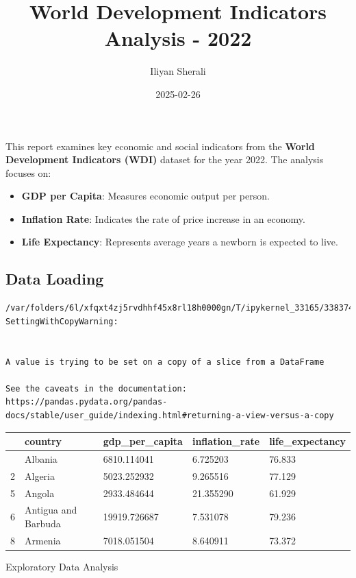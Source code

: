 \documentclass[
  letterpaper,
  DIV=11,
  numbers=noendperiod]{scrartcl}
\title{World Development Indicators Analysis - 2022}
\author{Iliyan Sherali}
\date{2025-02-26}
\providecommand{\tightlist}{%
  \setlength{\itemsep}{0pt}\setlength{\parskip}{0pt}}\usepackage{longtable,booktabs,array}
\begin{document}
\maketitle


This report examines key economic and social indicators from the
\textbf{World Development Indicators (WDI)} dataset for the year 2022.
The analysis focuses on:

\begin{itemize}
\tightlist
\item
  \textbf{GDP per Capita}: Measures economic output per person.
\item
  \textbf{Inflation Rate}: Indicates the rate of price increase in an
  economy.
\item
  \textbf{Life Expectancy}: Represents average years a newborn is
  expected to live.
\end{itemize}

\subsection{Data Loading}\label{data-loading}

\begin{verbatim}
/var/folders/6l/xfqxt4zj5rvdhhf45x8rl18h0000gn/T/ipykernel_33165/3383743568.py:10: SettingWithCopyWarning:


A value is trying to be set on a copy of a slice from a DataFrame

See the caveats in the documentation: https://pandas.pydata.org/pandas-docs/stable/user_guide/indexing.html#returning-a-view-versus-a-copy
\end{verbatim}

\begin{longtable}[]{@{}lllll@{}}
\toprule\noalign{}
& country & gdp\_per\_capita & inflation\_rate & life\_expectancy \\
\midrule\noalign{}
\endhead
\bottomrule\noalign{}
\endlastfoot
1 & Albania & 6810.114041 & 6.725203 & 76.833 \\
2 & Algeria & 5023.252932 & 9.265516 & 77.129 \\
5 & Angola & 2933.484644 & 21.355290 & 61.929 \\
6 & Antigua and Barbuda & 19919.726687 & 7.531078 & 79.236 \\
8 & Armenia & 7018.051504 & 8.640911 & 73.372 \\
\end{longtable}

Exploratory Data Analysis
\end{document}
